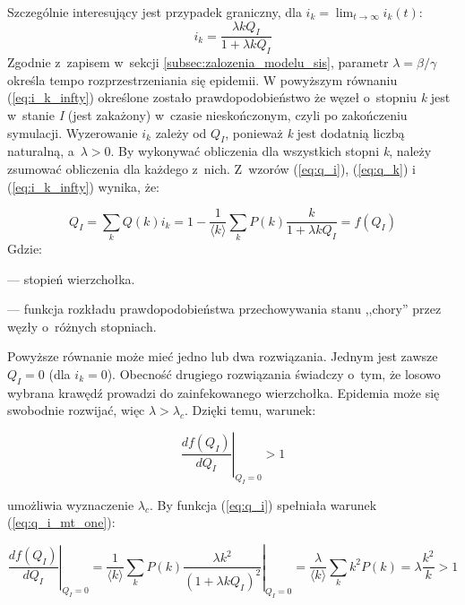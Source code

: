 Szczególnie interesujący jest przypadek graniczny, dla $\displaystyle i_k =  \lim_{t\to\infty} i_k(t)$:
\begin{equation}
\label{eq:i_k_infty}
i_k = \frac{\lambda k Q_I}{1+\lambda k Q_I}
\end{equation}
Zgodnie z~zapisem w~sekcji \ref{subsec:zalozenia_modelu_sis}, parametr $\lambda = \beta / \gamma $ określa tempo rozprzestrzeniania się epidemii.
W powyższym równaniu (\ref{eq:i_k_infty}) określone zostało prawdopodobieństwo że węzeł o~stopniu \emph{k} jest w~stanie \emph{I} (jest zakażony) w~czasie nieskończonym, czyli po zakończeniu symulacji. Wyzerowanie $i_k$ zależy od $Q_I$, ponieważ \emph{k} jest dodatnią liczbą naturalną, a~$\lambda > 0$.
By wykonywać obliczenia dla wszystkich stopni \emph{k}, należy zsumować obliczenia dla każdego z~nich. Z~wzorów (\ref{eq:q_i}), (\ref{eq:q_k}) i~ (\ref{eq:i_k_infty}) wynika, że:

\begin{equation}
\label{eq:q_i}
Q_I = \sum_{k}Q(k)i_k = 1 - \frac{1}{\langle k \rangle}\sum_{k}P(k)\frac{k}{1+\lambda k Q_I} = f(Q_I)
\end{equation}
Gdzie:
\begin{description} \itemsep0pt
\item[k] --- stopień wierzchołka.
\item[$\pmb{f(Q_I)}$] --- funkcja rozkładu prawdopodobieństwa przechowywania stanu ,,chory'' przez węzły o~różnych stopniach.
\end{description}
Powyższe równanie może mieć jedno lub dwa rozwiązania. Jednym jest zawsze $Q_I = 0$ (dla $i_k = 0$). Obecność drugiego rozwiązania świadczy o~tym, że losowo wybrana krawędź prowadzi do zainfekowanego wierzchołka. Epidemia może się swobodnie rozwijać, więc $\lambda > \lambda_c$. Dzięki temu, warunek:

\begin{equation}
\label{eq:q_i_mt_one}
\left.\frac{df(Q_I)}{dQ_I}\right|_{Q_I=0} > 1
\end{equation}

umożliwia wyznaczenie $\lambda_c$. By funkcja (\ref{eq:q_i}) spełniała warunek (\ref{eq:q_i_mt_one}):

\begin{equation}
\label{eq:q_i_mt_one_q_i}
\left.\frac{df(Q_I)}{dQ_I}\right|_{Q_I=0} = \left.\frac{1}{\langle k \rangle}\sum_{k}P(k)\frac{\lambda k^2}{(1+\lambda k Q_I)^2}\right|_{Q_I=0} = \frac{\lambda}{\langle k \rangle}\sum_{k}k^2P(k) = \lambda\frac{k^2}{k} > 1 
\end{equation}

